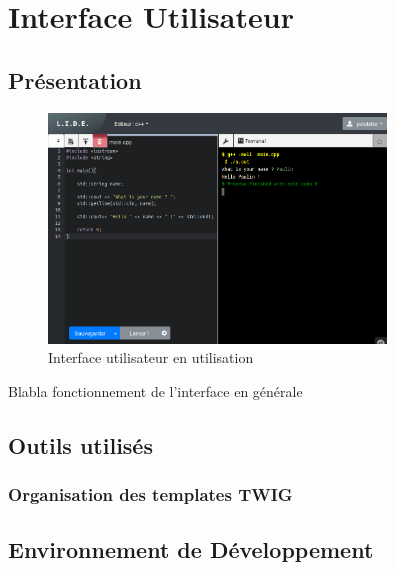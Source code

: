 \chapter{Interface Utilisateur}

\section{Présentation}

\begin{figure}[h]
  \centering
  \includegraphics[width=0.8\textwidth]{./frontend/example1.png}
  \caption{Interface utilisateur en utilisation}
  \label{}
\end{figure}

Blabla fonctionnement de l'interface en générale

\section{Outils utilisés}


\subsection{Organisation des templates TWIG}

\section{Environnement de Développement}

